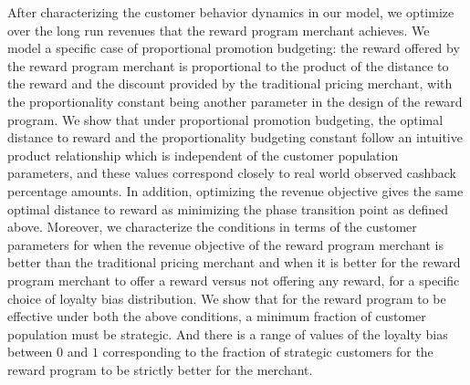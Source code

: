 After characterizing the customer behavior dynamics in our model, we optimize over the long run revenues that the reward program merchant achieves.
We model a specific case of proportional promotion budgeting: the reward offered by the reward program merchant is proportional to the product of the distance to the reward and the discount provided by the traditional pricing merchant, with the proportionality constant being another parameter in the design of the reward program.
We show that under proportional promotion budgeting, the optimal distance to reward and the proportionality budgeting constant follow an intuitive product relationship which is independent of the customer population parameters,
and these values correspond closely to real world observed cashback percentage amounts.
In addition, optimizing the revenue objective gives the same optimal distance to reward as minimizing the phase transition point as defined above.
Moreover, we characterize the conditions in terms of the customer parameters for when the revenue objective of the reward program merchant is better than the traditional pricing merchant and when it is better for the reward program merchant to offer a reward versus not offering any reward, for a specific choice of loyalty bias distribution.
We show that for the reward program to be effective under both the above conditions, a minimum fraction of customer population must be strategic.
And there is a range of values of the loyalty bias between $0$ and $1$ corresponding to the fraction of strategic customers for the reward program to be strictly better for the merchant. 

